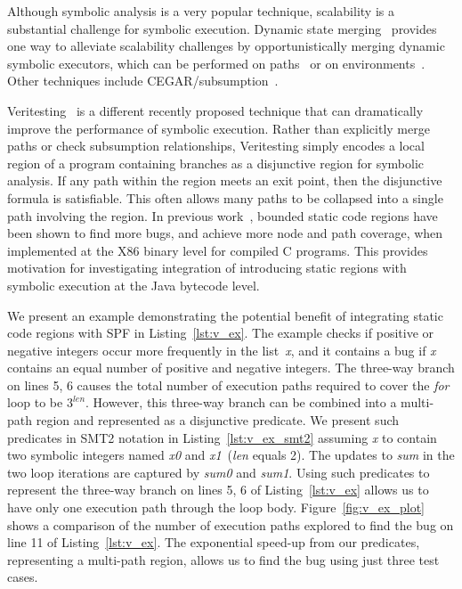 Although symbolic analysis is a very popular technique, scalability is a substantial challenge for symbolic execution.
%
Dynamic state merging~\cite{kuznetsov} provides one way to
alleviate scalability challenges by opportunistically merging dynamic
symbolic executors, which can be performed on paths~ or on environments~.  
Other techniques include CEGAR/subsumption~.
 
%
Veritesting~\cite{veritesting} is a different recently proposed technique that can dramatically improve the performance of symbolic execution.  Rather than explicitly merge paths or check subsumption relationships, Veritesting simply encodes a local region of a program containing branches as a disjunctive region for symbolic analysis.  If any path within the region meets an exit point, then the disjunctive formula is satisfiable.  This often allows many paths to be collapsed into a single path involving the region.  
%
In previous work~\cite{veritesting}, bounded static code regions have been shown to find more bugs, and achieve more node and path coverage, when implemented at the X86 binary level for compiled C programs.
%
This provides motivation for investigating integration of introducing static regions with symbolic execution at the Java bytecode level.





%
%
We present an example demonstrating the potential benefit of integrating static code regions with SPF in Listing~\ref{lst:v_ex}.
%
The example checks if positive or negative integers occur more frequently in the
list~\textit{x}, and it contains a bug if \textit{x} contains an
equal number of positive and negative integers.
%
The three-way branch on lines 5, 6 causes the total number of execution
paths required to cover the \textit{for} loop to be $3^{\textit{len}}$.
%
However, this three-way branch can be combined into a multi-path region
and represented as a disjunctive predicate.
We present such predicates in SMT2 notation in
Listing~\ref{lst:v_ex_smt2} assuming \textit{x} to contain two symbolic
integers named \textit{x0} and \textit{x1}~(\textit{len} equals 2).
%
The updates to \textit{sum} in the two loop iterations are captured by
\textit{sum0} and \textit{sum1}.
%
Using such predicates to represent the three-way branch on lines 5, 6 of
Listing~\ref{lst:v_ex} allows us to have only one execution path through
the loop body.
%
Figure~\ref{fig:v_ex_plot} shows a comparison of the number of execution
paths explored to find the bug on line 11 of Listing~\ref{lst:v_ex}.
%
The exponential speed-up from our predicates, representing a multi-path
region, allows us to find
the bug using just three test cases.

